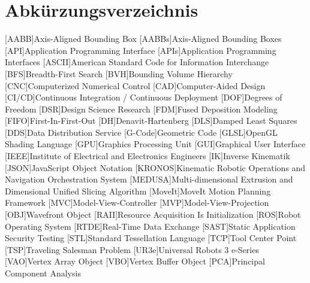 \chapter*{Abkürzungsverzeichnis}\label{chap:abbreviations}
    \begin{acronym}[]
        [AABB]{Axis-Aligned Bounding Box}
        [AABBs]{Axis-Aligned Bounding Boxes}
        [API]{Application Programming Interface}
        [APIs]{Application Programming Interfaces}
        [ASCII]{American Standard Code for Information Interchange}
        [BFS]{Breadth-First Search}
        [BVH]{Bounding Volume Hierarchy}
        [CNC]{Computerized Numerical Control}
        [CAD]{Computer-Aided Design}
        [CI/CD]{Continuous Integration / Continuous Deployment}
        [DOF]{Degrees of Freedom}
        [DSR]{Design Science Research}
        [FDM]{Fused Deposition Modeling}
        [FIFO]{First-In-First-Out}
        [DH]{Denavit-Hartenberg}
        [DLS]{Damped Least Squares}
        [DDS]{Data Distribution Service}
        [G-Code]{Geometric Code}
        [GLSL]{OpenGL Shading Language}
        [GPU]{Graphics Processing Unit}
        [GUI]{Graphical User Interface}
        [IEEE]{Institute of Electrical and Electronics Engineers}
        [IK]{Inverse Kinematik}
        [JSON]{JavaScript Object Notation}
        [KRONOS]{Kinematic Robotic Operations and Navigation Orchestration System}
        [MEDUSA]{Multi-dimensional Extrusion and Dimensional Unified Slicing Algorithm}
        [MoveIt]{MoveIt Motion Planning Framework}
        [MVC]{Model-View-Controller}
        [MVP]{Model-View-Projection}
        [OBJ]{Wavefront Object}
        [RAII]{Resource Acquisition Is Initialization}
        [ROS]{Robot Operating System}
        [RTDE]{Real-Time Data Exchange}
        [SAST]{Static Application Security Testing}
        [STL]{Standard Tessellation Language}
        [TCP]{Tool Center Point}
        [TSP]{Traveling Salesman Problem}
        [UR3e]{Universal Robots 3 e-Series}
        [VAO]{Vertex Array Object}
        [VBO]{Vertex Buffer Object}
        [PCA]{Principal Component Analysis}

\end{acronym}
